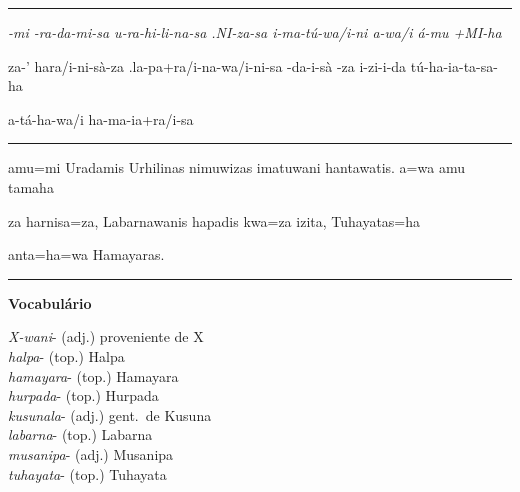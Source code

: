\vspace{10pt}
\hrule
\vspace{10pt}


\setcounter{parcount}{0}
\begin{parnumbersa}[]
	\raggedright%
	\itshape%
	-mi
	-ra-da-mi-sa
	u-ra-hi-li-na-sa
	.NI-za-sa
	i-ma-tú-wa/i-ni
	a-wa/i
	á-mu
	+MI-ha

	za-'
	hara/i-ni-sà-za
	.la-pa+ra/i-na-wa/i-ni-sa
	-da-i-sà
	-za
	i-zi-i-da
	tú-ha-ia-ta-sa-ha

	a-tá-ha-wa/i ha-ma-ia+ra/i-sa



\end{parnumbersa}

\vspace{10pt}
\hrule
\vspace{10pt}


\setcounter{parcount}{0}
\begin{parnumbersa}[]
	\raggedright%
	\itshape%

	amu=mi Uradamis Urhilinas nimuwizas imatuwani hantawatis. a=wa amu tamaha

	za harnisa=za, Labarnawanis hapadis kwa=za izita,
	Tuhayatas=ha

	anta=ha=wa Hamayaras.


\end{parnumbersa}

\vspace{10pt}
\hrule
\vspace{20pt}



\noindent\textbf{Vocabulário}
\begin{multicols}{2}
	\noindent \emph{X-wani}- (adj.) proveniente de X\\
	\noindent \emph{halpa}- (top.)  Halpa\\
	\noindent \emph{hamayara}- (top.)  Hamayara\\
	\noindent \emph{hurpada}- (top.)  Hurpada\\
	\noindent \emph{kusunala}- (adj.) gent.\ de Kusuna\\
	\noindent \emph{labarna}- (top.) Labarna \\
	\noindent \emph{musanipa}- (adj.)  Musanipa\\
	\noindent \emph{tuhayata}- (top.)  Tuhayata\\
\end{multicols}
